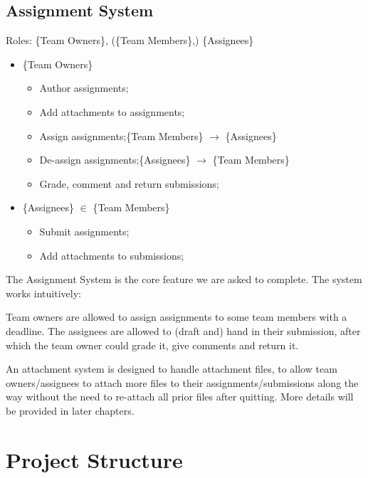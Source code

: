 \documentclass[12pt]{report}
\newcommand{\n}{\par}
\newcommand{\br}{\vspace{1 em}\n}
\begin{document}
\subsection{Assignment System} \label{overview.project-objectives.assignment-system}
Roles: \{Team Owners\}, (\{Team Members\},) \{Assignees\}\n
\begin{itemize}
	\item \{Team Owners\}
	      \begin{itemize}
		      \item Author assignments;
		      \item Add attachments to assignments;
		      \item Assign assignments;\null\hfill \{Team Members\} $\rightarrow$ \{Assignees\}
		      \item De-assign assignments;\null\hfill \{Assignees\} $\rightarrow$ \{Team Members\}
		      \item Grade, comment and return submissions;
	      \end{itemize}
	\item \{Assignees\} $\in$ \{Team Members\}
	      \begin{itemize}
		      \item Submit assignments;
		      \item Add attachments to submissions;
	      \end{itemize}
\end{itemize}\n
The Assignment System is the core feature we are asked to complete.
The system works intuitively:\n
Team owners are allowed to assign assignments to some team members with a deadline.
The assignees are allowed to (draft and) hand in their submission,
after which the team owner could grade it, give comments and return it.
\br
An attachment system is designed to handle attachment files, to allow team owners/assignees
to attach more files to their assignments/submissions along the way
without the need to re-attach all prior files after quitting.
More details will be provided in later chapters.
\section{Project Structure} \label{overview.project-structure}
\end{document}

